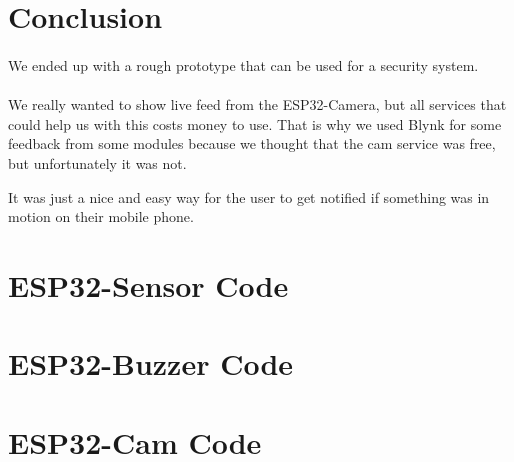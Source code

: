 \documentclass[a4paper, 12pt]{article}        %
\begin{document}
    \pagebreak
    \section{Conclusion}\label{sec:conclusion}

    \paragraph{}
    We ended up with a rough prototype that can be used for a security system.

    \paragraph{}
    We really wanted to show live feed from the ESP32-Camera, but all services that could help us with this costs money to use.
    That is why we used Blynk for some feedback from some modules because we thought that the cam service was free,
    but unfortunately it was not.

    \paragragh{}
    It was just a nice and easy way for the user to get notified if something
    was in motion on their mobile phone.

    \pagebreak
    \appendix

    \section{ESP32-Sensor Code}
    
    \pagebreak

    \section{ESP32-Buzzer Code}
    
    \pagebreak

    \section{ESP32-Cam Code}
    
    \pagebreak
\end{document}

